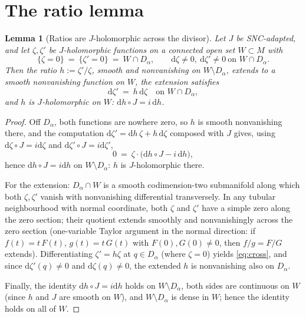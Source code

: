 \documentclass[11pt]{article}
\newtheorem{lemma}[theorem]{Lemma}
\theoremstyle{definition}
\theoremstyle{remark}
\newcommand{\dd}{\mathrm{d}}
\begin{document}
\section{The ratio lemma}\label{sec:ratio}

\begin{lemma}[Ratios are $J$-holomorphic across the divisor]
\label{lem:ratio}
Let $J$ be SNC-adapted, and let $\zeta,\zeta'$ be $J$-holomorphic
functions on a connected open set $W\subset M$ with
\[
\{\zeta=0\}\ =\ \{\zeta'=0\}\ =\ W\cap D_\alpha,
\qquad \dd\zeta\neq0,\ \dd\zeta'\neq0\ \text{on }W\cap D_\alpha .
\]
Then the ratio $h:=\zeta'/\zeta$, smooth and nonvanishing on
$W\setminus D_\alpha$, extends to a smooth nonvanishing function on
$W$, the extension satisfies
\begin{equation}\label{eq:cross}
\dd\zeta'\ =\ h\,\dd\zeta\quad\text{on }W\cap D_\alpha,
\end{equation}
and $h$ is $J$-holomorphic on $W$: $\dd h\circ J=i\,\dd h$.
\end{lemma}

\begin{proof}
Off $D_\alpha$, both functions are nowhere zero, so $h$ is smooth
nonvanishing there, and the computation
$\dd\zeta'=\dd h\,\zeta+h\,\dd\zeta$ composed with $J$ gives, using
$\dd\zeta\circ J=i\dd\zeta$ and $\dd\zeta'\circ J=i\dd\zeta'$,
\[
0\ =\ \zeta\cdot\bigl(\dd h\circ J-i\,\dd h\bigr),
\]
hence $\dd h\circ J=i\dd h$ on $W\setminus D_\alpha$: $h$ is
$J$-holomorphic there.

For the extension: $D_\alpha\cap W$ is a smooth codimension-two
submanifold along which both $\zeta,\zeta'$ vanish with nonvanishing
differential transversely. In any tubular neighbourhood with normal
coordinate, both ${\zeta}$ and ${\zeta}'$ have a simple zero along
the zero section; their quotient extends smoothly and nonvanishingly
across the zero section (one-variable Taylor argument in the normal
direction: if $f(t)=t\,F(t)$, $g(t)=t\,G(t)$ with $F(0),G(0)\neq0$,
then $f/g=F/G$ extends). Differentiating
$\zeta'=h\zeta$ at $q\in D_\alpha$ (where $\zeta=0$) yields
\eqref{eq:cross}, and since $\dd\zeta'(q)\neq0$ and
$\dd\zeta(q)\neq0$, the extended $h$ is nonvanishing also on
$D_\alpha$.

Finally, the identity $\dd h\circ J=i\dd h$ holds on
$W\setminus D_\alpha$, both sides are continuous on $W$ (since $h$
and $J$ are smooth on $W$), and $W\setminus D_\alpha$ is dense in
$W$; hence the identity holds on all of $W$.
\end{proof}
\end{document}
